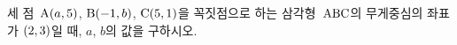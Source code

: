 세 점~$\mathrm{A}(a{,}\mkern3mu\mathopen{}5)$, $\mathrm{B}(-1{,}\mkern3mu\mathopen{}b)$, $\mathrm{C}(5{,}\mkern3mu\mathopen{}1)$을 꼭짓점으로 하는 삼각형~$\mathrm{ABC}$의 무게중심의 좌표가 $(2{,}\mkern3mu\mathopen{}3)$일 때, $a$, $b$의 값을 구하시오.
